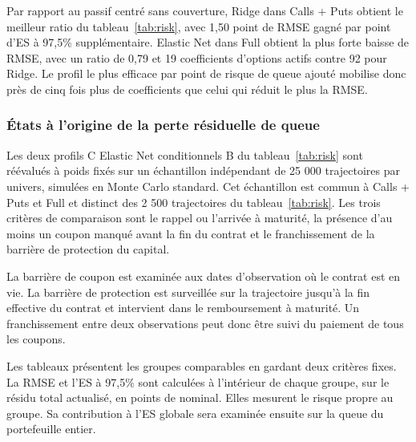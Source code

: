 \documentclass[12pt,a4paper]{article}
\newcommand{\1}{\mathbf{1}}
\begin{document}
Par rapport au passif centré sans couverture, Ridge dans Calls + Puts obtient le meilleur ratio du tableau~\ref{tab:risk}, avec 1,50 point de RMSE gagné par point d’ES à 97,5\% supplémentaire. Elastic Net dans Full obtient la plus forte baisse de RMSE, avec un ratio de 0,79 et 19 coefficients d’options actifs contre 92 pour Ridge. Le profil le plus efficace par point de risque de queue ajouté mobilise donc près de cinq fois plus de coefficients que celui qui réduit le plus la RMSE.




\subsubsection*{États à l'origine de la perte résiduelle de queue}

Les deux profils C Elastic Net conditionnels B du tableau~\ref{tab:risk} sont réévalués à poids fixés sur un échantillon indépendant de 25 000 trajectoires par univers, simulées en Monte Carlo standard. Cet échantillon est commun à Calls + Puts et Full et distinct des 2 500 trajectoires du tableau~\ref{tab:risk}. Les trois critères de comparaison sont le rappel ou l’arrivée à maturité, la présence d’au moins un coupon manqué avant la fin du contrat et le franchissement de la barrière de protection du capital.

La barrière de coupon est examinée aux dates d’observation où le contrat est en vie. La barrière de protection est surveillée sur la trajectoire jusqu’à la fin effective du contrat et intervient dans le remboursement à maturité. Un franchissement entre deux observations peut donc être suivi du paiement de tous les coupons.

Les tableaux présentent les groupes comparables en gardant deux critères fixes. La RMSE et l’ES à 97,5\% sont calculées à l’intérieur de chaque groupe, sur le résidu total actualisé, en points de nominal. Elles mesurent le risque propre au groupe. Sa contribution à l’ES globale sera examinée ensuite sur la queue du portefeuille entier.
\end{document}
